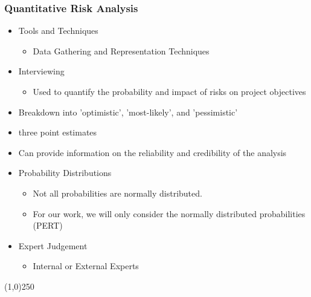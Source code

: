 \begin{frame}
\frametitle{Quantitative Risk Analysis}
\begin{itemize}
	\item Tools and Techniques
		\begin{itemize}
			\item Data Gathering and Representation Techniques
		\end{itemize}
	\item Interviewing
		\begin{itemize}
			\item Used to quantify the probability and impact of risks on project objectives
		\end{itemize}
	\item Breakdown into 'optimistic', 'most-likely', and 'pessimistic' 
	\item three point estimates
	\item Can provide information on the reliability and credibility of the analysis
	\item Probability Distributions
		\begin{itemize}
			\item Not all probabilities are normally distributed.
			\item For our work, we will only consider the normally distributed probabilities (PERT)
		\end{itemize}
	\item Expert Judgement
		\begin{itemize}
			\item Internal or External Experts
		\end{itemize}
\end{itemize}
\end{frame}\begin{center}\line(1,0){250}\end{center}





	
	
	
